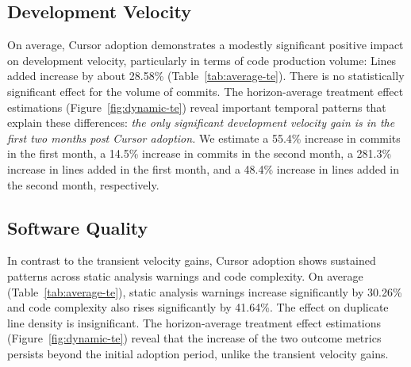 \subsection{Development Velocity}
\label{sec:finding-velocity}

On average, Cursor adoption demonstrates a modestly significant positive impact on development 
velocity, particularly in terms of code production volume: Lines added increase by about 28.58\% (Table~\ref{tab:average-te}).
There is no statistically significant effect for the volume of commits. 
The horizon-average treatment effect estimations (Figure~\ref{fig:dynamic-te}) reveal 
important temporal patterns that explain these differences: \emph{the only significant development velocity gain is in the first two months post Cursor adoption.}
We estimate a 55.4\% increase in commits in the first month, a 14.5\% increase in commits in the second month, a 281.3\% increase in lines added in the first month, and a 48.4\% increase in lines added in the second month, respectively. 


\subsection{Software Quality}
\label{sec:finding-quality}

In contrast to the transient velocity gains, Cursor adoption shows 
sustained patterns across static analysis warnings and code complexity.
On average (Table~\ref{tab:average-te}), static analysis warnings increase significantly by 30.26\% and code complexity also rises significantly by 41.64\%.
The effect on duplicate line density is insignificant.
The horizon-average treatment effect estimations (Figure~\ref{fig:dynamic-te}) reveal 
that the increase of the two outcome metrics persists beyond the 
initial adoption period, unlike the transient velocity gains. 


